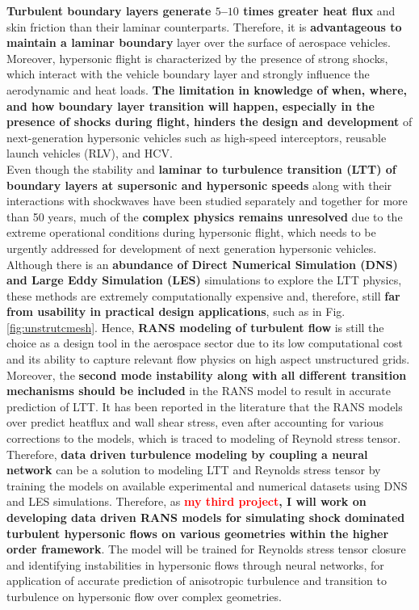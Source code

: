 \documentclass[11pt,sans]{wlscirep} %
\begin{document}
\noindent \textbf{Turbulent boundary layers generate $5$–$10$ times greater heat flux} and skin friction than their laminar counterparts. Therefore, it is \textbf{advantageous to maintain a laminar boundary} layer over the surface of aerospace vehicles. Moreover, hypersonic flight is characterized by the presence of strong shocks, which interact with the vehicle boundary layer and strongly influence the aerodynamic and heat loads. \textbf{The limitation in knowledge of when, where, and how boundary layer transition will happen, especially in the presence of shocks during flight, hinders the design and development} of next-generation hypersonic vehicles such as high-speed interceptors, reusable launch vehicles (RLV), and HCV\cite{berry2011recommendations}. \\
\noindent Even though the stability and \textbf{laminar to turbulence transition (LTT) of boundary layers at supersonic and hypersonic speeds} along with their interactions with shockwaves have been studied separately and together for more than 50 years, much of the \textbf{complex physics remains unresolved} due to the extreme operational conditions during hypersonic flight, which needs to be urgently addressed for development of next generation hypersonic vehicles\cite{knight2018hypersonic}.
Although there is an \textbf{abundance of Direct Numerical Simulation (DNS)\cite{huang2025laminar} and Large Eddy Simulation (LES)}\cite{fu2021shock} simulations to explore the LTT physics, these methods are extremely computationally expensive and, therefore, still \textbf{far from usability in practical design applications}, such as in Fig. \ref{fig:unstrutcmesh}. Hence, \textbf{RANS modeling of turbulent flow} is still the choice as a design tool in the aerospace sector due to its low computational cost and its ability to capture relevant flow physics on high aspect unstructured grids. Moreover, the \textbf{second mode instability along with all different transition mechanisms should be included} in the RANS model to result in accurate prediction of LTT. It has been reported in the literature that the RANS models over predict heatflux and wall shear stress, even after accounting for various corrections to the models, which is traced to modeling of Reynold stress tensor\cite{DURAISAMY20251}. Therefore, \textbf{data driven turbulence modeling by coupling a neural network} can be a solution to modeling LTT and Reynolds stress tensor by training the models on available experimental and numerical datasets using DNS and LES simulations\cite{danvin2019laminar, bhatnagar2019prediction, paredes2020toward, parish2024data}. Therefore, as \textbf{\textcolor{red}{my third project}, I will work on developing data driven RANS models for simulating shock dominated turbulent hypersonic flows on various geometries within the higher order framework}. The model will be trained for Reynolds stress tensor closure and identifying instabilities in hypersonic flows through neural networks, for application of accurate prediction of anisotropic turbulence and transition to turbulence on hypersonic flow over complex geometries.%
\end{document}
